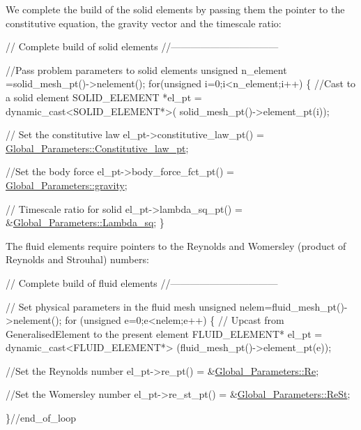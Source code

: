 We complete the build of the solid elements by passing them the pointer to the constitutive equation, the gravity vector and the timescale ratio\+:


\begin{DoxyCodeInclude}
 

 \textcolor{comment}{// Complete build of solid elements}
 \textcolor{comment}{//---------------------------------}

 \textcolor{comment}{//Pass problem parameters to solid elements}
 \textcolor{keywordtype}{unsigned}  n\_element =solid\_mesh\_pt()->nelement();
 \textcolor{keywordflow}{for}(\textcolor{keywordtype}{unsigned} i=0;i<n\_element;i++)
  \{
   \textcolor{comment}{//Cast to a solid element}
   SOLID\_ELEMENT *el\_pt = \textcolor{keyword}{dynamic\_cast<}SOLID\_ELEMENT*\textcolor{keyword}{>}(
    solid\_mesh\_pt()->element\_pt(i));
   
   \textcolor{comment}{// Set the constitutive law}
   el\_pt->constitutive\_law\_pt() =
    \hyperlink{namespaceGlobal__Parameters_adbd1f040f375c96fe56b3f475f7dbec2}{Global\_Parameters::Constitutive\_law\_pt};
   
   \textcolor{comment}{//Set the body force}
   el\_pt->body\_force\_fct\_pt() = \hyperlink{namespaceGlobal__Parameters_a200109847bf4cc26da4d00e8d68d569e}{Global\_Parameters::gravity};

   \textcolor{comment}{// Timescale ratio for solid}
   el\_pt->lambda\_sq\_pt() = &\hyperlink{namespaceGlobal__Parameters_a3e3428638f89f970fcf2148b0bab1465}{Global\_Parameters::Lambda\_sq};
  \}

\end{DoxyCodeInclude}


The fluid elements require pointers to the Reynolds and Womersley (product of Reynolds and Strouhal) numbers\+:


\begin{DoxyCodeInclude}
 
 

 \textcolor{comment}{// Complete build of fluid elements}
 \textcolor{comment}{//---------------------------------}

 \textcolor{comment}{// Set physical parameters in the fluid mesh}
 \textcolor{keywordtype}{unsigned} nelem=fluid\_mesh\_pt()->nelement();
 \textcolor{keywordflow}{for} (\textcolor{keywordtype}{unsigned} e=0;e<nelem;e++)
  \{
   \textcolor{comment}{// Upcast from GeneralisedElement to the present element}
   FLUID\_ELEMENT* el\_pt = \textcolor{keyword}{dynamic\_cast<}FLUID\_ELEMENT*\textcolor{keyword}{>}
    (fluid\_mesh\_pt()->element\_pt(e));
   
   \textcolor{comment}{//Set the Reynolds number}
   el\_pt->re\_pt() = &\hyperlink{namespaceGlobal__Parameters_a9d72e94a9305c6a310940a6a427ebe06}{Global\_Parameters::Re};   
   
   \textcolor{comment}{//Set the Womersley number}
   el\_pt->re\_st\_pt() = &\hyperlink{namespaceGlobal__Parameters_a7a59a32365e87566069e458dc83bd18a}{Global\_Parameters::ReSt};
   
  \}\textcolor{comment}{//end\_of\_loop}

\end{DoxyCodeInclude}


